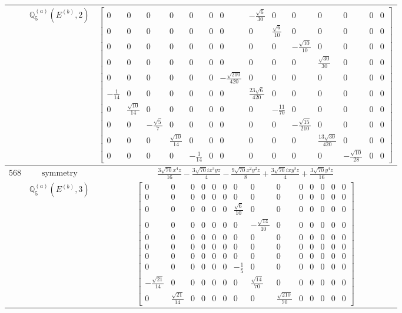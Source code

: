 \documentclass[fleqn,8pt,landscape]{jsarticle}
\begin{document}
\begin{longtable}{ccc}
$  $ & $ \mathbb{Q}_{5}^{(a)}(E^{(b)},2) $ & $ \begin{bmatrix} 0 & 0 & 0 & 0 & 0 & 0 & 0 & - \frac{\sqrt{6}}{30} & 0 & 0 & 0 & 0 & 0 & 0 \\ 0 & 0 & 0 & 0 & 0 & 0 & 0 & 0 & \frac{\sqrt{6}}{10} & 0 & 0 & 0 & 0 & 0 \\ 0 & 0 & 0 & 0 & 0 & 0 & 0 & 0 & 0 & - \frac{\sqrt{10}}{10} & 0 & 0 & 0 & 0 \\ 0 & 0 & 0 & 0 & 0 & 0 & 0 & 0 & 0 & 0 & \frac{\sqrt{30}}{30} & 0 & 0 & 0 \\ 0 & 0 & 0 & 0 & 0 & 0 & - \frac{\sqrt{210}}{420} & 0 & 0 & 0 & 0 & 0 & 0 & 0 \\ - \frac{1}{14} & 0 & 0 & 0 & 0 & 0 & 0 & \frac{23 \sqrt{6}}{420} & 0 & 0 & 0 & 0 & 0 & 0 \\ 0 & \frac{\sqrt{10}}{14} & 0 & 0 & 0 & 0 & 0 & 0 & - \frac{11}{70} & 0 & 0 & 0 & 0 & 0 \\ 0 & 0 & - \frac{\sqrt{5}}{7} & 0 & 0 & 0 & 0 & 0 & 0 & - \frac{\sqrt{15}}{210} & 0 & 0 & 0 & 0 \\ 0 & 0 & 0 & \frac{\sqrt{10}}{14} & 0 & 0 & 0 & 0 & 0 & 0 & \frac{13 \sqrt{30}}{420} & 0 & 0 & 0 \\ 0 & 0 & 0 & 0 & - \frac{1}{14} & 0 & 0 & 0 & 0 & 0 & 0 & - \frac{\sqrt{10}}{28} & 0 & 0 \end{bmatrix} $ \\ \hline
$ 568 $ & $ \text{symmetry} $ & $ \frac{3 \sqrt{70} x^{4} z}{16} - \frac{3 \sqrt{70} i x^{3} y z}{4} - \frac{9 \sqrt{70} x^{2} y^{2} z}{8} + \frac{3 \sqrt{70} i x y^{3} z}{4} + \frac{3 \sqrt{70} y^{4} z}{16} $ \\
$  $ & $ \mathbb{Q}_{5}^{(a)}(E^{(b)},3) $ & $ \begin{bmatrix} 0 & 0 & 0 & 0 & 0 & 0 & 0 & 0 & 0 & 0 & 0 & 0 & 0 & 0 \\ 0 & 0 & 0 & 0 & 0 & 0 & 0 & 0 & 0 & 0 & 0 & 0 & 0 & 0 \\ 0 & 0 & 0 & 0 & 0 & 0 & \frac{\sqrt{6}}{10} & 0 & 0 & 0 & 0 & 0 & 0 & 0 \\ 0 & 0 & 0 & 0 & 0 & 0 & 0 & - \frac{\sqrt{14}}{10} & 0 & 0 & 0 & 0 & 0 & 0 \\ 0 & 0 & 0 & 0 & 0 & 0 & 0 & 0 & 0 & 0 & 0 & 0 & 0 & 0 \\ 0 & 0 & 0 & 0 & 0 & 0 & 0 & 0 & 0 & 0 & 0 & 0 & 0 & 0 \\ 0 & 0 & 0 & 0 & 0 & 0 & 0 & 0 & 0 & 0 & 0 & 0 & 0 & 0 \\ 0 & 0 & 0 & 0 & 0 & 0 & - \frac{1}{5} & 0 & 0 & 0 & 0 & 0 & 0 & 0 \\ - \frac{\sqrt{21}}{14} & 0 & 0 & 0 & 0 & 0 & 0 & \frac{\sqrt{14}}{70} & 0 & 0 & 0 & 0 & 0 & 0 \\ 0 & \frac{\sqrt{21}}{14} & 0 & 0 & 0 & 0 & 0 & 0 & \frac{\sqrt{210}}{70} & 0 & 0 & 0 & 0 & 0 \end{bmatrix} $ \\ \hline

\end{longtable}
\end{document}
